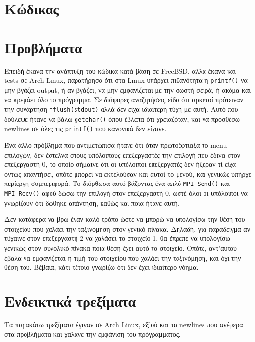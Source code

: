 \documentclass{article}
\begin{document}
\section{Κώδικας}


\section{Προβλήματα}
Επειδή έκανα την ανάπτυξη του κώδικα κατά βάση σε FreeBSD, αλλά έκανα και tests
σε Arch Linux, παρατήρησα ότι στα Linux υπάρχει πιθανότητα η \lstinline{printf()}
να μην βγάζει output, ή αν βγάζει, να μην εμφανίζεται με την σωστή σειρά, ή ακόμα
και να κρεμάει όλο το πρόγραμμα. Σε διάφορες αναζητήσεις είδα ότι αρκετοί πρότειναν
την συνάρτηση \lstinline{fflush(stdout)} αλλά δεν είχα ιδιαίτερη τύχη με αυτή.
Αυτό που δούλεψε ήτανε να βάλω \lstinline{getchar()} όπου έβλεπα ότι χρειαζόταν,
και να προσθέσω newlines σε όλες τις \lstinline{printf()} που κανονικά δεν είχανε.

Ένα άλλο πρόβλημα που αντιμετώπισα ήτανε ότι όταν πρωτοέφτιαξα το menu επιλογών, δεν
έστελνα στους υπόλοιπους επεξεργαστές την επιλογή που έδινα στον επεξεργαστή 0,
το οποίο σήμαινε ότι οι υπόλοιποι επεξεργατές δεν ήξεραν τί είχα όντως απαντήσει,
οπότε μπορεί να εκτελούσαν και αυτοί το μενού, και γενικώς υπήρχε περίεργη
συμπεριφορά. Το διόρθωσα αυτό βάζοντας ένα απλό \lstinline{MPI_Send()} και
\lstinline{MPI_Recv()} αφού δώσω την επιλογή στον επεξεργαστή 0, ωστέ όλοι οι
υπόλοιποι να γνωρίζουν ότι δώθηκε απάντηση, καθώς και ποια ήτανε αυτή.

Δεν κατάφερα να βρω έναν καλό τρόπο ώστε να μπορώ να υπολογίσω την θέση του
στοιχείου που χαλάει την ταξινόμηση στον γενικό πίνακα. Δηλαδή, για παράδειγμα
αν τύχαινε στον επεξεργαστή 2 να χαλάσει το στοιχείο 1, θα έπρεπε να υπολογίσω
γενικώς στον συνολικό πίνακα ποια θέση έχει αυτό το στοιχείο. Οπότε, αντ'αυτού
έβαλα να εμφανίζεται η τιμή του στοιχείου που χαλάει την ταξινόμηση, και όχι την
θέση του. Βέβαια, κάτι τέτοιο γνωρίζω ότι δεν έχει ιδιαίτερο νόημα.

\section{Ενδεικτικά τρεξίματα}
Τα παρακάτω τρεξίματα έγιναν σε Arch Linux, εξ'ού και τα newlines που ανέφερα
στα προβλήματα και χαλάνε την εμφάνιση του πρόγραμματος.
\end{document}
